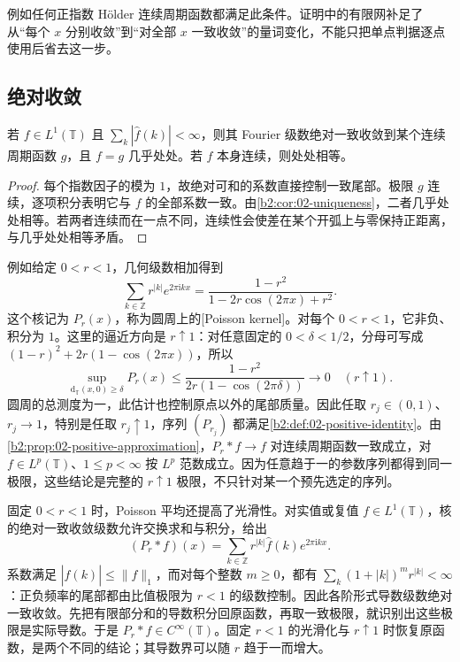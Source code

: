 例如任何正指数 Hölder 连续周期函数都满足此条件。证明中的有限网补足了从“每个 \(x\) 分别收敛”到“对全部 \(x\) 一致收敛”的量词变化，不能只把单点判据逐点使用后省去这一步。

\subsection{绝对收敛}
\label{b2:subsec:020503}

\begin{proposition}\label{b2:prop:02-absolute}
若 \(f\in L^1(\mathbb T)\) 且 \(\sum_k|\widehat f(k)|<\infty\)，则其 Fourier 级数绝对一致收敛到某个连续周期函数 \(g\)，且 \(f=g\) 几乎处处。若 \(f\) 本身连续，则处处相等。
\end{proposition}
\begin{proof}
每个指数因子的模为 \(1\)，故绝对可和的系数直接控制一致尾部。极限 \(g\) 连续，逐项积分表明它与 \(f\) 的全部系数一致。由\cref{b2:cor:02-uniqueness}，二者几乎处处相等。若两者连续而在一点不同，连续性会使差在某个开弧上与零保持正距离，与几乎处处相等矛盾。
\end{proof}

例如给定 \(0<r<1\)，几何级数相加得到
\[
 \sum_{k\in\mathbb Z}r^{|k|}e^{2\pi\mathrm{i}kx}
 =\dfrac{1-r^2}{1-2r\cos(2\pi x)+r^2}.
\]
这个核记为 \(P_r(x)\)，称为圆周上的[Poisson kernel]。对每个 \(0<r<1\)，它非负、积分为 \(1\)。这里的逼近方向是 \(r\uparrow1\)：对任意固定的 \(0<\delta<1/2\)，分母可写成 \((1-r)^2+2r(1-\cos(2\pi x))\)，所以
\[
 \sup_{\mathrm d_{\mathbb T}(x,0)\geq\delta}P_r(x)
 \leq\frac{1-r^2}{2r(1-\cos(2\pi\delta))}
 \longrightarrow0\quad(r\uparrow1).
\]
圆周的总测度为一，此估计也控制原点以外的尾部质量。因此任取 \(r_j\in(0,1)\)、\(r_j\to1\)，特别是任取 \(r_j\uparrow1\)，序列 \((P_{r_j})\) 都满足\cref{b2:def:02-positive-identity}。由\cref{b2:prop:02-positive-approximation}，\(P_r*f\to f\) 对连续周期函数一致成立，对 \(f\in L^p(\mathbb T)\)、\(1\leq p<\infty\) 按 \(L^p\) 范数成立。因为任意趋于一的参数序列都得到同一极限，这些结论是完整的 \(r\uparrow1\) 极限，不只针对某一个预先选定的序列。

\ProseParagraphBreak

固定 \(0<r<1\) 时，Poisson 平均还提高了光滑性。对实值或复值 \(f\in L^1(\mathbb T)\)，核的绝对一致收敛级数允许交换求和与积分，给出
\[
 (P_r*f)(x)=\sum_{k\in\mathbb Z}r^{|k|}\widehat f(k)e^{2\pi\mathrm i kx}.
\]
系数满足 \(|\widehat f(k)|\leq\|f\|_1\)，而对每个整数 \(m\geq0\)，都有 \(\sum_k(1+|k|)^m r^{|k|}<\infty\)：正负频率的尾部都由比值极限为 \(r<1\) 的级数控制。因此各阶形式导数级数绝对一致收敛。先把有限部分和的导数积分回原函数，再取一致极限，就识别出这些极限是实际导数。于是 \(P_r*f\in C^\infty(\mathbb T)\)。固定 \(r<1\) 的光滑化与 \(r\uparrow1\) 时恢复原函数，是两个不同的结论；其导数界可以随 \(r\) 趋于一而增大。

